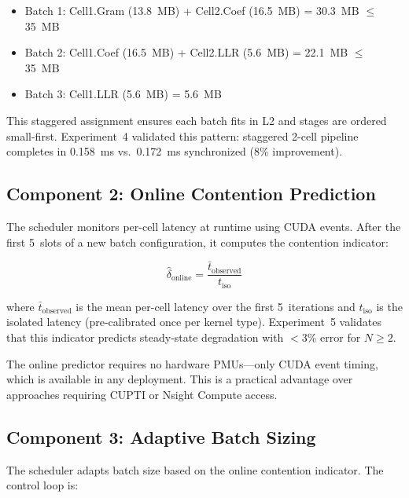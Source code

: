 \begin{itemize}[leftmargin=*,nosep]
\item Batch 1: Cell1.Gram (13.8~MB) + Cell2.Coef (16.5~MB) = 30.3~MB $\leq$ 35~MB
\item Batch 2: Cell1.Coef (16.5~MB) + Cell2.LLR (5.6~MB) = 22.1~MB $\leq$ 35~MB
\item Batch 3: Cell1.LLR (5.6~MB) = 5.6~MB
\end{itemize}

This staggered assignment ensures each batch fits in L2 and stages are ordered small-first. Experiment~4 validated this pattern: staggered 2-cell pipeline completes in 0.158~ms vs.\ 0.172~ms synchronized (8\% improvement).

\subsection{Component 2: Online Contention Prediction}
\label{sec:online}

The scheduler monitors per-cell latency at runtime using CUDA events. After the first 5~slots of a new batch configuration, it computes the contention indicator:

\begin{equation}
\hat{\delta}_{\text{online}} = \frac{\bar{t}_{\text{observed}}}{t_{\text{iso}}}
\label{eq:online_delta}
\end{equation}

where $\bar{t}_{\text{observed}}$ is the mean per-cell latency over the first 5~iterations and $t_{\text{iso}}$ is the isolated latency (pre-calibrated once per kernel type). Experiment~5 validates that this indicator predicts steady-state degradation with $<$3\% error for $N \geq 2$.

The online predictor requires no hardware PMUs---only CUDA event timing, which is available in any deployment. This is a practical advantage over approaches requiring CUPTI or Nsight Compute access.

\subsection{Component 3: Adaptive Batch Sizing}
\label{sec:adaptive}

The scheduler adapts batch size based on the online contention indicator. The control loop is:

